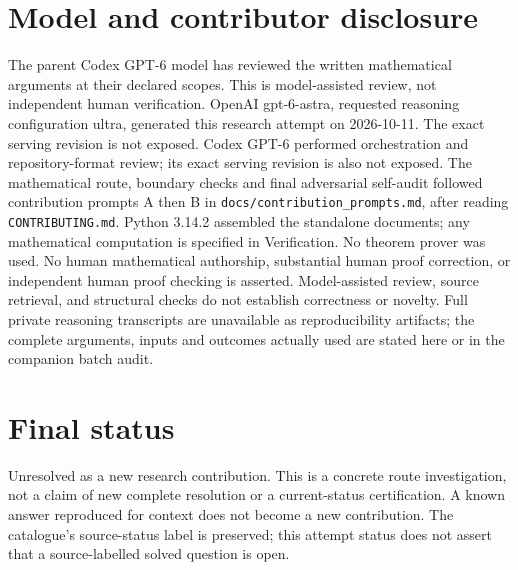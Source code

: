 \documentclass[11pt]{article}
\begin{document}
\section{Model and contributor disclosure}
The parent Codex GPT-6 model has reviewed the written mathematical arguments at their declared scopes. This is model-assisted review, not independent human verification.
OpenAI gpt-6-astra, requested reasoning configuration ultra, generated this research
attempt on 2026-10-11. The exact serving revision is not exposed. Codex GPT-6
performed orchestration and repository-format review; its exact serving revision
is also not exposed. The mathematical route, boundary checks and final adversarial
self-audit followed contribution prompts A then B in
\texttt{docs/contribution\_prompts.md}, after reading \texttt{CONTRIBUTING.md}.
Python 3.14.2 assembled the standalone documents; any mathematical computation is
specified in Verification. No theorem prover was used. No human mathematical
authorship, substantial human proof correction, or independent human proof checking
is asserted. Model-assisted review, source retrieval, and structural checks do not
establish correctness or novelty. Full private reasoning transcripts are unavailable
as reproducibility artifacts; the complete arguments, inputs and outcomes actually
used are stated here or in the companion batch audit.
\section{Final status}
Unresolved as a new research contribution. This is a concrete route investigation,
not a claim of new complete resolution or a current-status certification. A known
answer reproduced for context does not become a new contribution. The catalogue's
source-status label is preserved; this attempt status does not assert that a
source-labelled solved question is open.
\end{document}

